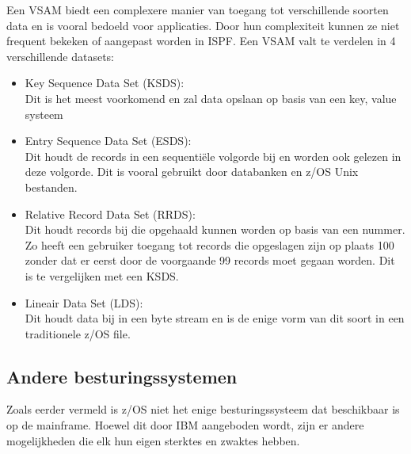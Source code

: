 Een VSAM biedt een complexere manier van toegang tot verschillende soorten data en is vooral bedoeld voor applicaties. Door hun complexiteit kunnen ze niet frequent bekeken of aangepast worden in ISPF. Een VSAM valt te verdelen in 4 verschillende datasets:
\begin{itemize}
    \item Key Sequence Data Set (KSDS): \\Dit is het meest voorkomend en zal data opslaan op basis van een key, value systeem
    \item Entry Sequence Data Set (ESDS): \\Dit houdt de records in een sequentiële volgorde bij en worden ook gelezen in deze volgorde. Dit is vooral gebruikt door databanken en z/OS Unix bestanden.
    \item Relative Record Data Set (RRDS): \\Dit houdt records bij die opgehaald kunnen worden op basis van een nummer. Zo heeft een gebruiker toegang tot records die opgeslagen zijn op plaats 100 zonder dat er eerst door de voorgaande 99 records moet gegaan worden. Dit is te vergelijken met een KSDS.
    \item Lineair Data Set (LDS): \\Dit houdt data bij in een byte stream en is de enige vorm van dit soort in een traditionele z/OS file.
\end{itemize}
\autocite{IBM}

\subsection{Andere besturingssystemen}
Zoals eerder vermeld is z/OS niet het enige besturingssysteem dat beschikbaar is op de mainframe. Hoewel dit door IBM aangeboden wordt, zijn er andere mogelijkheden die elk hun eigen sterktes en zwaktes hebben. \\

